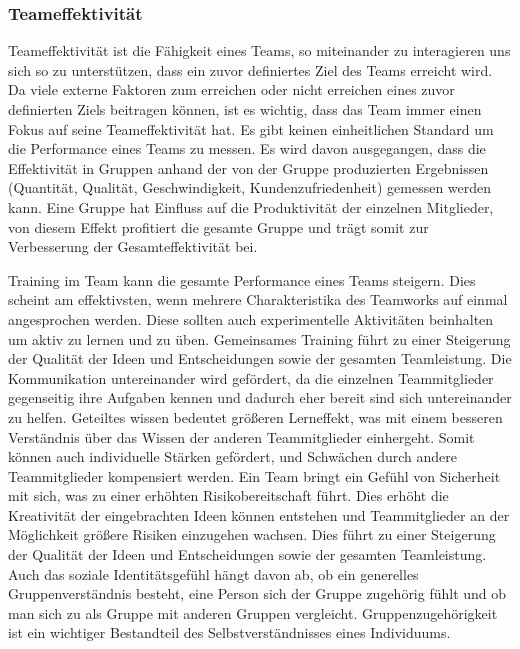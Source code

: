 \documentclass[a4paper,11pt]{article}%
\renewcommand{\\}{\vspace*{0.5\baselineskip} \newline}
\begin{document}

		\subsubsection{Teameffektivität}

Teameffektivität ist die Fähigkeit eines Teams, so miteinander zu interagieren uns sich so zu unterstützen, dass ein zuvor definiertes Ziel des Teams erreicht wird. Da viele externe Faktoren zum erreichen oder nicht erreichen eines zuvor definierten Ziels beitragen können, ist es wichtig, dass das Team immer einen Fokus auf seine Teameffektivität hat.
\citep[p.557]{salas2005there}
	Es gibt keinen einheitlichen Standard um die Performance eines Teams zu messen. Es wird davon ausgegangen, dass die Effektivität in Gruppen anhand der von der Gruppe produzierten Ergebnissen (Quantität, Qualität, Geschwindigkeit, Kundenzufriedenheit) gemessen werden kann. Eine Gruppe hat Einfluss auf die Produktivität der einzelnen Mitglieder, von diesem Effekt profitiert die gesamte Gruppe und trägt somit zur Verbesserung der Gesamteffektivität bei. \citep[p.309]{guzzo1996teams}
	
	Training im Team kann die gesamte Performance eines Teams steigern. Dies scheint am effektivsten, wenn mehrere Charakteristika des Teamworks auf einmal angesprochen werden. Diese sollten auch experimentelle Aktivitäten beinhalten um aktiv zu lernen und zu üben. \citep[19]{mcewan2017effectiveness}
Gemeinsames Training führt zu einer Steigerung der Qualität der Ideen und Entscheidungen sowie der gesamten Teamleistung.
	Die Kommunikation untereinander wird gefördert, da die einzelnen Teammitglieder gegenseitig ihre Aufgaben kennen und dadurch eher bereit sind sich untereinander zu helfen.
	Geteiltes wissen bedeutet größeren Lerneffekt, was mit einem besseren Verständnis über das Wissen der anderen Teammitglieder einhergeht. Somit können auch individuelle Stärken gefördert, und Schwächen durch andere Teammitglieder kompensiert werden.
	Ein Team bringt ein Gefühl von Sicherheit mit sich, was zu einer erhöhten Risikobereitschaft führt. Dies erhöht die Kreativität der eingebrachten Ideen können entstehen und Teammitglieder an der Möglichkeit größere Risiken einzugehen wachsen. \citep[p. 2-4]{biech2007pfeiffer}
	Dies führt zu einer Steigerung der Qualität der Ideen und Entscheidungen sowie der gesamten Teamleistung.
Auch das soziale Identitätsgefühl hängt davon ab, ob ein generelles Gruppenverständnis besteht, eine Person sich der Gruppe zugehörig fühlt und ob man sich zu als Gruppe mit anderen Gruppen vergleicht. Gruppenzugehörigkeit ist ein wichtiger Bestandteil des Selbstverständnisses eines Individuums. \citep{sutantovicious}
	
\end{document}
